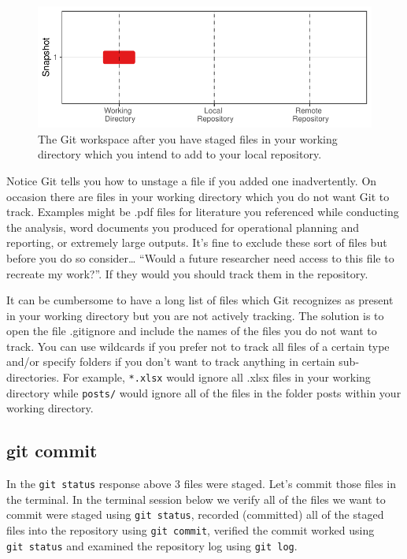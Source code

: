 \documentclass[
  letterpaper,
  DIV=11,
  numbers=noendperiod]{scrreprt}
\begin{document}
\begin{figure}

{\centering \includegraphics{basics_files/figure-pdf/fig-add-1.pdf}

}

\caption{\label{fig-add}The Git workspace after you have staged files in
your working directory which you intend to add to your local
repository.}

\end{figure}

Notice Git tells you how to unstage a file if you added one
inadvertently. On occasion there are files in your working directory
which you do not want Git to track. Examples might be .pdf files for
literature you referenced while conducting the analysis, word documents
you produced for operational planning and reporting, or extremely large
outputs. It's fine to exclude these sort of files but before you do so
consider\ldots{} ``Would a future researcher need access to this file to
recreate my work?''. If they would you should track them in the
repository.

It can be cumbersome to have a long list of files which Git recognizes
as present in your working directory but you are not actively tracking.
The solution is to open the file .gitignore and include the names of the
files you do not want to track. You can use wildcards if you prefer not
to track all files of a certain type and/or specify folders if you don't
want to track anything in certain sub-directories. For example,
\texttt{*.xlsx} would ignore all .xlsx files in your working directory
while \texttt{posts/} would ignore all of the files in the folder posts
within your working directory.

\hypertarget{git-commit}{%
\subsection{git commit}\label{git-commit}}

In the \texttt{git\ status} response above 3 files were staged. Let's
commit those files in the terminal. In the terminal session below we
verify all of the files we want to commit were staged using
\texttt{git\ status}, recorded (committed) all of the staged files into
the repository using \texttt{git\ commit}, verified the commit worked
using \texttt{git\ status} and examined the repository log using
\texttt{git\ log}.
\end{document}
